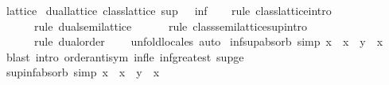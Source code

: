 \begin{isabellebody}
\isanewline
{}\isamarkupfalse%
\isanewline
\isanewline
{}\isamarkupfalse%
\ lattice\isanewline
{}\isanewline
\isanewline
{}\isamarkupfalse%
\ dual{\isacharunderscore}{\kern0pt}lattice{\isacharcolon}{\kern0pt}\ {\isachardoublequoteopen}class{\isachardot}{\kern0pt}lattice\ sup\ {\isacharparenleft}{\kern0pt}{\isasymge}{\isacharparenright}{\kern0pt}\ {\isacharparenleft}{\kern0pt}{\isachargreater}{\kern0pt}{\isacharparenright}{\kern0pt}\ inf{\isachardoublequoteclose}\isanewline
%
\isadelimproof
\ \ %
\endisadelimproof
%
\isatagproof
{}\isamarkupfalse%
\ {\isacharparenleft}{\kern0pt}rule\ class{\isachardot}{\kern0pt}lattice{\isachardot}{\kern0pt}intro{\isacharcomma}{\kern0pt}\isanewline
\ \ \ \ \ \ rule\ dual{\isacharunderscore}{\kern0pt}semilattice{\isacharcomma}{\kern0pt}\isanewline
\ \ \ \ \ \ rule\ class{\isachardot}{\kern0pt}semilattice{\isacharunderscore}{\kern0pt}sup{\isachardot}{\kern0pt}intro{\isacharcomma}{\kern0pt}\isanewline
\ \ \ \ \ \ rule\ dual{\isacharunderscore}{\kern0pt}order{\isacharparenright}{\kern0pt}\isanewline
\ \ \ \ {\isacharparenleft}{\kern0pt}unfold{\isacharunderscore}{\kern0pt}locales{\isacharcomma}{\kern0pt}\ auto{\isacharparenright}{\kern0pt}%
\endisatagproof
{\isafoldproof}%
%
\isadelimproof
\isanewline
%
\endisadelimproof
\isanewline
{}\isamarkupfalse%
\ inf{\isacharunderscore}{\kern0pt}sup{\isacharunderscore}{\kern0pt}absorb\ {\isacharbrackleft}{\kern0pt}simp{\isacharbrackright}{\kern0pt}{\isacharcolon}{\kern0pt}\ {\isachardoublequoteopen}x\ {\isasymsqinter}\ {\isacharparenleft}{\kern0pt}x\ {\isasymsqunion}\ y{\isacharparenright}{\kern0pt}\ {\isacharequal}{\kern0pt}\ x{\isachardoublequoteclose}\isanewline
%
\isadelimproof
\ \ %
\endisadelimproof
%
\isatagproof
{}\isamarkupfalse%
\ {\isacharparenleft}{\kern0pt}blast\ intro{\isacharcolon}{\kern0pt}\ order{\isachardot}{\kern0pt}antisym\ inf{\isacharunderscore}{\kern0pt}le{}\ inf{\isacharunderscore}{\kern0pt}greatest\ sup{\isacharunderscore}{\kern0pt}ge{}{\isacharparenright}{\kern0pt}%
\endisatagproof
{\isafoldproof}%
%
\isadelimproof
\isanewline
%
\endisadelimproof
\isanewline
{}\isamarkupfalse%
\ sup{\isacharunderscore}{\kern0pt}inf{\isacharunderscore}{\kern0pt}absorb\ {\isacharbrackleft}{\kern0pt}simp{\isacharbrackright}{\kern0pt}{\isacharcolon}{\kern0pt}\ {\isachardoublequoteopen}x\ {\isasymsqunion}\ {\isacharparenleft}{\kern0pt}x\ {\isasymsqinter}\ y{\isacharparenright}{\kern0pt}\ {\isacharequal}{\kern0pt}\ x{\isachardoublequoteclose}\isanewline

\end{isabellebody}
